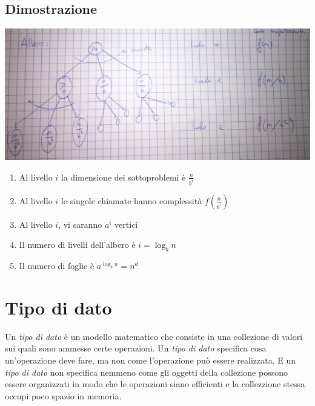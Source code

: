 \documentclass[italian]{article}
\newcommand{\dateright}[1]{\normalfont{\normalsize{\hfill #1 \\}}}
\begin{document}
\subsection{Dimostrazione}
\dateright{13 Ottobre 2016}
\begin{center}
	\includegraphics[width=1\linewidth]{images/albero_teorema_master}
\end{center}
\begin{enumerate}[label=\alph*)]
	\item Al livello $i$ la dimensione dei sottoproblemi è $\frac{n}{b^i}$
	\item Al livello $i$ le singole chiamate hanno complessità $f\left(\frac{n}{b^i}\right)$
	\item Al livello $i$, vi saranno $a^i$ vertici
	\item Il numero di livelli dell'albero è $i=\log_bn$
	\item Il numero di foglie è $a^{\log_bn} = n^d$
\end{enumerate}
\pagebreak
\section{Tipo di dato}
Un \textit{tipo di dato} è un modello matematico che consiste in una collezione di valori sui quali sono ammesse certe operazioni. Un \textit{tipo di dato} specifica cosa un'operazione deve fare, ma non come l'operazione può essere realizzata. E un \textit{tipo di dato} non specifica nemmeno come gli oggetti della collezione possono essere organizzati in modo che le operazioni siano efficienti e la collezzione stessa occupi poco spazio in memoria.
\end{document}
